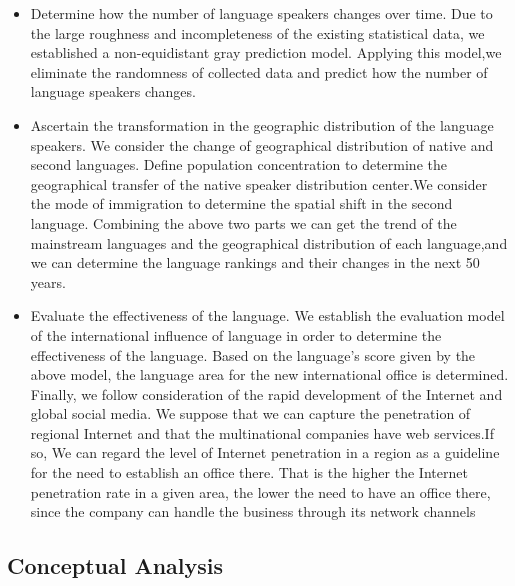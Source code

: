 \begin{itemize}
	\item 
	Determine how the number of language speakers changes over time. Due to the large roughness and incompleteness of the existing statistical data, we established a non-equidistant gray prediction model. Applying this model,we eliminate the randomness of collected data and predict how the number of language speakers changes.
	\item Ascertain the transformation in the geographic distribution of the language speakers. We consider the change of geographical distribution of native and second languages. Define population concentration to determine the geographical transfer of the native speaker distribution center.We consider the mode of immigration to determine the spatial shift in the second language. Combining the above two parts we can get the trend of the mainstream languages and the geographical distribution of each language,and we can determine the language rankings and their changes in the next 50 years. 
	\item Evaluate the effectiveness of the language. We establish the evaluation model of the international influence of language in order to determine the effectiveness of the language. Based on the language's score given by the above model, the language area for the new international office is determined. Finally, we follow consideration of the rapid development of the Internet and global social media. We suppose that we can capture the penetration of regional Internet and that the multinational companies have web services.If so, We can regard the level of Internet penetration in a region as a guideline for the need to establish an office there. That is the higher the Internet penetration rate in a given area, the lower the need to have an office there, since the company can handle the business through its network channels
	
\end{itemize}


\subsection{Conceptual Analysis}

